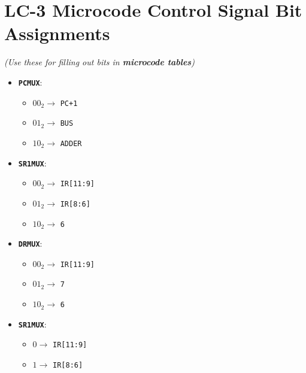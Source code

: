 \section*{LC-3 Microcode Control Signal Bit Assignments}
\begin{center}
    \large
    \textit{(Use these for filling out bits in \textbf{microcode tables})}
\end{center}
\vspace{1em}
\centering
\begin{minipage}{0.35\linewidth}
    \Large
    \begin{itemize}
        \item \textbf{\texttt{PCMUX}}:
            \begin{itemize}
                \item ${00}_2 \rightarrow$ \texttt{PC+1}
                \item ${01}_2 \rightarrow$ \texttt{BUS}
                \item ${10}_2 \rightarrow$ \texttt{ADDER}
            \end{itemize}
        \ifio
            \item \textbf{\texttt{SR1MUX}}:
                \begin{itemize}
                    \item ${00}_2 \rightarrow$ \texttt{IR[11:9]}
                    \item ${01}_2 \rightarrow$ \texttt{IR[8:6]}
                    \item ${10}_2 \rightarrow$ \texttt{6}
                \end{itemize}
            \item \textbf{\texttt{DRMUX}}:
                \begin{itemize}
                    \item ${00}_2 \rightarrow$ \texttt{IR[11:9]}
                    \item ${01}_2 \rightarrow$ \texttt{7}
                    \item ${10}_2 \rightarrow$ \texttt{6}
                \end{itemize}
        \else
            \item \textbf{\texttt{SR1MUX}}:
                \begin{itemize}
                    \item $0 \rightarrow$ \texttt{IR[11:9]}
                    \item $1 \rightarrow$ \texttt{IR[8:6]}
                \end{itemize}

\end{itemize}
\end{minipage}
